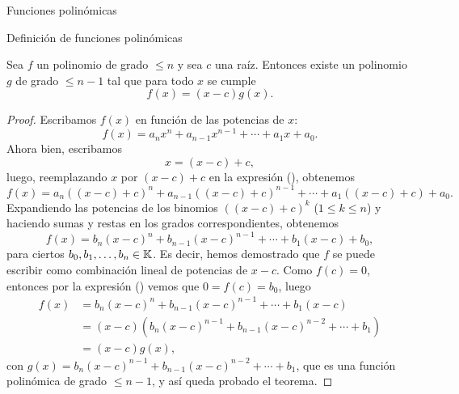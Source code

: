 \begin{chapter}{Funciones polinómicas}
\begin{section}{Definición de funciones polinómicas}
    \begin{teorema}\label{th-fact-raiz}
        Sea $f$ un polinomio de grado $\le n$ y sea $c$ una raíz. Entonces existe un polinomio $g$ de grado $\le n - 1$ tal que para todo $x$ se cumple
        \begin{equation*}
            f (x) = (x - c) g (x).
        \end{equation*}
    \end{teorema}
    \begin{proof} Escribamos $f(x)$ en función de las potencias de  $x$:
        \begin{equation}\label{eq-funcion-polinomica-2}
            f(x) = a_nx^n + a_{n-1}x^{n-1}+\cdots + a_1x +a_0.
        \end{equation}
        Ahora bien,  escribamos
        \begin{equation*}
            x = (x-c)+ c,
        \end{equation*}
        luego, reemplazando $x$ por $(x-c)+ c$ en la expresión (), obtenemos
        \begin{equation*}
            f(x) = a_n((x-c)+ c)^n + a_{n-1}((x-c)+ c)^{n-1}+\cdots + a_1((x-c)+ c) +a_0.
        \end{equation*}
        Expandiendo las potencias de los binomios $((x-c)+ c)^k$ ($1 \le k \le n$) y haciendo sumas y restas en los grados correspondientes,  obtenemos
        \begin{equation}\label{eq-funcion-polinomica-3}
            f(x) = b_n(x-c)^n + b_{n-1}(x-c)^{n-1}+\cdots + b_1(x-c) +b_0,
        \end{equation}
        para ciertos $b_0, b_1,\ldots ,b_n \in \mathbb K$. Es decir,  hemos demostrado que $f$ se puede escribir como combinación lineal de potencias de $x-c$. Como $f(c) = 0$,  entonces por la expresión () vemos que  $0=f(c)=b_0$,  luego
        \begin{align*}
            f(x) & = b_n(x-c)^n + b_{n-1}(x-c)^{n-1}+\cdots + b_1(x-c)       \\
                 & = (x-c)(b_n(x-c)^{n-1} + b_{n-1}(x-c)^{n-2}+\cdots + b_1) \\
                 & =(x-c)g(x),
        \end{align*}
        con $g(x) =b_n(x-c)^{n-1} + b_{n-1}(x-c)^{n-2}+\cdots + b_1$,  que es una función polinómica de grado $\le n-1$, y así queda probado el teorema.
    \end{proof}


\end{section}
\end{chapter}
